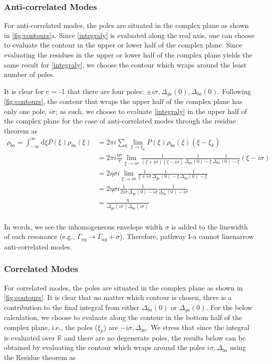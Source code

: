 \documentclass[aip, jcp, draft, onecolumn]{revtex4-2}
\begin{document}
\begin{widetext}
\subsubsection{Anti-correlated Modes}
For anti-correlated modes, the poles are situated in the complex plane as shown in \autoref{fig:contours}a.
Since \autoref{integraly} is evaluated along the real axis, one can choose to evaluate the contour in the upper or lower half of the complex plane.
Since evaluating the residues in the upper or lower half of the complex plane yields the same result for \autoref{integraly}, we choose the contour which wraps around the least number of poles.

It is clear for c = -1 that there are four poles: $\pm i \sigma, \Delta_{ga}(0), \Delta_{ba}(0)$. 
Following \autoref{fig:contours}, the contour that wraps the upper half of the complex plane has only one pole, $i \sigma$; as such, we choose to evaluate \autoref{integraly} in the upper half of the complex plane for the case of anti-correlated modes through the residue theorem as
	\begin{equation}
		\begin{split}
			\rho_{ba} = \int_{-\infty}^\infty \mathrm{d}\xi P(\xi) \rho_{ba}(\xi) &= 2\pi i \sum_k \lim_{\xi \rightarrow \xi_k} P(\xi) \rho_{ba}(\xi) (\xi - \xi_k)\\
			&= 2\pi i \frac{\eta \sigma}{\pi} \lim_{\xi \rightarrow i\sigma} \frac{1}{(\xi + i\sigma)(\xi - i\sigma)} \frac{1}{\Delta_{ga}(0) - \xi} \frac{1}{\Delta_{ba}(0) - \xi} (\xi - i \sigma)\\
			&= 2 \eta \sigma i \lim_{\xi \rightarrow i\sigma} \frac{1}{\xi + i\sigma} \frac{1}{\Delta_{ga}(0) - \xi} \frac{1}{\Delta_{ba}(0) - \xi}\\
			&= 2\eta \sigma i \frac{1}{2i\sigma} \frac{1}{\Delta_{ga}(0) - i\sigma} \frac{1}{\Delta_{ba}(0) - i\sigma}\\
			&= \frac{\eta}{\Delta_{ga}(i\sigma)\Delta_{ba}(i \sigma)}\\
		\end{split}
	\end{equation}


In words, we see the inhomogeneous envelope width $\sigma$ is added to the linewidth of each resonance (e.g., $\Gamma_{ag} \rightarrow \Gamma_{ag} + \sigma$).
Therefore, pathway I-a cannot linenarrow anti-correlated modes. 
\subsubsection{Correlated Modes}
For correlated modes, the poles are situated in the complex plane as shown in \autoref{fig:contours}.
It is clear that no matter which contour is chosen, there is a contribution to the final integral from either $\Delta_{ba}(0)$ or $\Delta_{ga}(0)$. 
For the below calculation, we choose to evaluate along the contour in the bottom half of the complex plane, i.e., the poles ($\xi_k$) are $-i\sigma, \Delta_{ga}$.
We stress that since the integral is evaluated over $\mathbb{R}$ and there are no degenerate poles, the results below can be obtained by evaluating the contour which wraps around the poles $i\sigma, \Delta_{ba}$ using the Residue theorem as 


\end{widetext}
\end{document}
